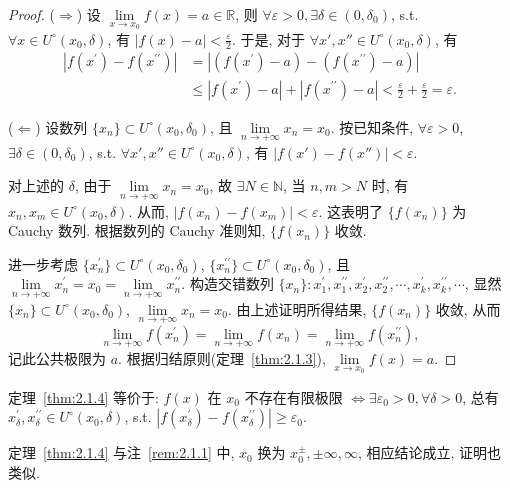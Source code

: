 \begin{proof}
($\Rightarrow$) 设 $\lim\limits_{x\to x_0}f(x)=a\in\mathbb{R}$, 则 $\forall\varepsilon>0,\exists\delta\in(0,\delta_0)$, s.t. $\forall x\in U^\circ(x_0,\delta)$, 有 $|f(x)-a|<\frac{\varepsilon}{2}$. 于是, 对于 $\forall x',x''\in U^\circ(x_0,\delta)$, 有
\begin{align*}
|f(x^{\prime})-f(x^{\prime \prime})| &= |(f(x^{\prime})-a)-(f(x^{\prime \prime})-a)| \\
&\leqslant |f(x^{\prime})-a|+|f(x^{\prime \prime})-a| < \frac{\varepsilon}{2}+\frac{\varepsilon}{2}=\varepsilon.
\end{align*}

($\Leftarrow$) 设数列 $\{x_n\}\subset U^\circ(x_0,\delta_0)$, 且 $\lim\limits_{n\to+\infty}x_n=x_0$. 按已知条件, $\forall\varepsilon>0$, $\exists\delta\in(0,\delta_0)$, s.t. $\forall x',x''\in U^\circ(x_0,\delta)$, 有 $|f(x')-f(x'')|<\varepsilon$.

对上述的 $\delta$, 由于 $\lim\limits_{n\to+\infty}x_n=x_0$, 故 $\exists N\in\mathbb{N}$, 当 $n,m>N$ 时, 有 $x_n,x_m\in U^\circ(x_0,\delta)$. 从而, $|f(x_n)-f(x_m)|<\varepsilon$. 这表明了 $\{f(x_n)\}$ 为 Cauchy 数列. 根据数列的 Cauchy 准则知, $\{f(x_n)\}$ 收敛.

进一步考虑 $\{x_{n}^{\prime}\}\subset U^{\circ}(x_{0},\delta_{0})$, $\{x_{n}^{\prime\prime}\}\subset U^{\circ}(x_{0},\delta_{0})$, 且 $\lim\limits_{n\to+\infty}x_{n}^{\prime}=x_{0}=\lim\limits_{n\to+\infty}x_{n}^{\prime\prime}$. 构造交错数列 $\{x_n\}\colon x_{1}^{\prime}, x_{1}^{\prime\prime}, x_{2}^{\prime}, x_{2}^{\prime\prime}, \cdots, x_{k}^{\prime}, x_{k}^{\prime\prime}, \cdots$, 显然 $\{x_{n}\}\subset U^{\circ}(x_{0},\delta_{0})$, $\lim\limits_{n\to+\infty}x_{n}=x_{0}$. 由上述证明所得结果, $\{f(x_{n})\}$ 收敛, 从而
\[
\lim_{n\to+\infty}f(x_{n}^{\prime})=\lim_{n\to+\infty}f(x_{n})=\lim_{n\to+\infty}f(x_{n}^{\prime\prime}),
\]
记此公共极限为 $a$. 根据归结原则(定理~\ref{thm:2.1.3}), $\lim\limits_{x\to x_0}f(x)=a$.
\end{proof}

\begin{remark}\label{rem:2.1.1}
定理~\ref{thm:2.1.4} 等价于: $f(x)$ 在 $x_{0}$ 不存在有限极限 $\iff \exists \varepsilon_{0} > 0, \forall \delta > 0$, 总有 $x_{\delta}^{\prime}, x_{\delta}^{\prime\prime} \in U^{\circ}(x_{0}, \delta)$, s.t. $|f(x_{\delta}^{\prime}) - f(x_{\delta}^{\prime\prime})| \geqslant \varepsilon_{0}$.
\end{remark}

\begin{remark}\label{rem:2.1.2}
定理~\ref{thm:2.1.4} 与注~\ref{rem:2.1.1} 中, $x_{0}$ 换为 $x_{0}^{\pm}, \pm\infty, \infty$, 相应结论成立, 证明也类似.
\end{remark}

